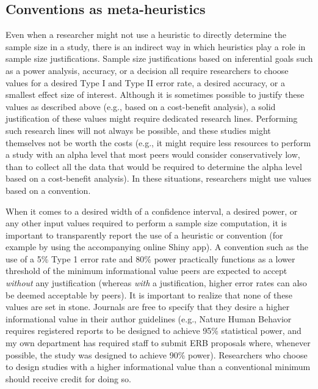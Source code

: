 \documentclass[
  english,
  ,jou,floatsintext]{apa6}
\begin{document}
\hypertarget{conventions-as-meta-heuristics}{%
\subsection{Conventions as meta-heuristics}\label{conventions-as-meta-heuristics}}

Even when a researcher might not use a heuristic to directly determine the sample size in a study, there is an indirect way in which heuristics play a role in sample size justifications. Sample size justifications based on inferential goals such as a power analysis, accuracy, or a decision all require researchers to choose values for a desired Type I and Type II error rate, a desired accuracy, or a smallest effect size of interest. Although it is sometimes possible to justify these values as described above (e.g., based on a cost-benefit analysis), a solid justification of these values might require dedicated research lines. Performing such research lines will not always be possible, and these studies might themselves not be worth the costs (e.g., it might require less resources to perform a study with an alpha level that most peers would consider conservatively low, than to collect all the data that would be required to determine the alpha level based on a cost-benefit analysis). In these situations, researchers might use values based on a convention.

When it comes to a desired width of a confidence interval, a desired power, or any other input values required to perform a sample size computation, it is important to transparently report the use of a heuristic or convention (for example by using the accompanying online Shiny app). A convention such as the use of a 5\% Type 1 error rate and 80\% power practically functions as a lower threshold of the minimum informational value peers are expected to accept \emph{without} any justification (whereas \emph{with} a justification, higher error rates can also be deemed acceptable by peers). It is important to realize that none of these values are set in stone. Journals are free to specify that they desire a higher informational value in their author guidelines (e.g., Nature Human Behavior requires registered reports to be designed to achieve 95\% statistical power, and my own department has required staff to submit ERB proposals where, whenever possible, the study was designed to achieve 90\% power). Researchers who choose to design studies with a higher informational value than a conventional minimum should receive credit for doing so.
\end{document}
